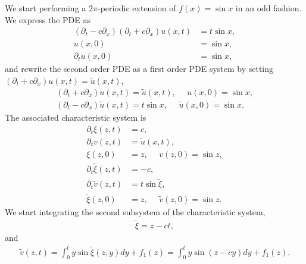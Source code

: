 \begin{questions}

\begin{solution}
We start performing a $2\pi$-periodic extension of $f(x)=\sin{x}$ in an odd fashion. We express the PDE as
\begin{align*}
(\partial_t-c\partial_x)(\partial_t+c\partial_x)u(x,t)&=t\sin{x},\\
u(x,0)&=\sin{x},\\
\partial_tu(x,0)&=\sin{x},
\end{align*}
and rewrite the second order PDE as a first order PDE system by setting $(\partial_t+c\partial_x)u(x,t)=\tilde{u}(x,t)$,
\begin{align*}
(\partial_t+c\partial_x)u(x,t)=\tilde{u}(x,t),~~~~~~u(x,0)=\sin{x},\\
(\partial_t-c\partial_x)\tilde{u}(x,t)=t\sin{x},~~~~~~\tilde{u}(x,0)=\sin{x}.
\end{align*}
The associated characteristic system is
\begin{align*}
\partial_t\xi(z,t)&=c,\\
\partial_tv(z,t)&=\tilde{u}(x,t),\\
\xi(z,0)&=z,~~~~~~v(z,0)=\sin{z},\\
\partial_t\tilde{\xi}(z,t)&=-c,\\
\partial_t\tilde{v}(z,t)&=t\sin{\tilde{\xi}},\\
\tilde{\xi}(z,0)&=z,~~~~~~\tilde{v}(z,0)=\sin{z}.
\end{align*}
We start integrating the second subsystem of the characteristic system,
\begin{align*}
\tilde{\xi}=z-ct,
\end{align*}
and
\begin{align*}
\tilde{v}(z,t)=\int_0^ty\sin{\tilde{\xi}(z,y)}dy+f_1(z)=\int_0^ty\sin{(z-cy)}dy+f_1(z).
\end{align*}

\end{solution}
\end{questions}

